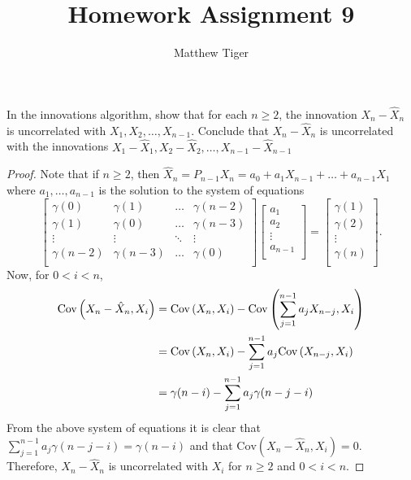 \documentclass[12pt]{article}
\title{Homework Assignment 9}
\author{Matthew Tiger}
\theoremstyle{definition}
\newenvironment{custompbm}[1]
  {\renewcommand\theproblem{#1}\problem}
  {\endproblem}
\newcommand{\Co}[2]{\text{Cov}\left({#1}, {#2}\right)}
\begin{document}
\maketitle


\begin{custompbm}{2.20}
  In the innovations algorithm, show that for each $n\geq 2$, the innovation
  $X_n - \hat{X}_n$ is uncorrelated with $X_1, X_2, \dots, X_{n-1}$. Conclude that
  $X_n - \hat{X}_n$ is uncorrelated with the innovations
  $X_1 - \hat{X}_1, X_2 - \hat{X}_2, \dots, X_{n-1} - \hat{X}_{n-1}$
\end{custompbm}

\begin{proof}
  Note that if $n \geq 2$, then $\hat{X}_n = P_{n-1}X_n = a_0 + a_1 X_{n-1} + \dots + a_{n-1}X_{1}$
  where $a_1, \dots, a_{n-1}$ is the solution to the system of equations
  \[
    \begin{bmatrix}
      \gamma(0) & \gamma(1) & \hdots & \gamma(n-2) \\
      \gamma(1) & \gamma(0) & \hdots & \gamma(n-3) \\
      \vdots & \vdots & \ddots & \vdots \\
      \gamma(n-2) & \gamma(n-3) & \hdots & \gamma(0) \\
    \end{bmatrix}
    \begin{bmatrix}
      a_1 \\
      a_2 \\
      \vdots \\
      a_{n-1} \\
    \end{bmatrix}
    =
    \begin{bmatrix}
      \gamma(1) \\
      \gamma(2) \\
      \vdots \\
      \gamma(n) \\
    \end{bmatrix}.
  \]
  Now, for $0 < i < n$,
  \begin{align}\label{sum}
    \Co{X_n - \hat{X}_n}{X_i} &= \Co{X_n}{X_i} - \Co{\sum_{j=1}^{n-1} a_j X_{n-j}}{X_i} \notag\\
    &= \Co{X_n}{X_i} - \sum_{j=1}^{n-1} a_j \Co{X_{n-j}}{X_i} \notag \\
    &= \gamma(n-i) - \sum_{j=1}^{n-1} a_j \gamma(n-j-i)
  \end{align}
  From the above system of equations it is clear that $\sum_{j=1}^{n-1} a_j \gamma(n-j-i) = \gamma(n-i)$
  and that $\Co{X_n - \hat{X}_n}{X_i} = 0$. Therefore,
  $X_n - \hat{X}_n$ is uncorrelated with $X_i$ for $n\geq 2$ and $0 < i < n$.


\end{proof}
\end{document}
